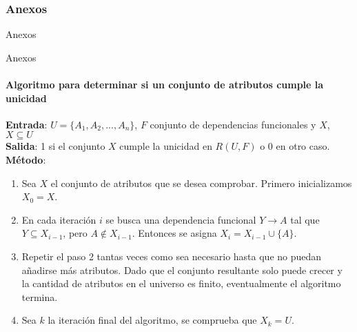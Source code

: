 \begin{frame}
    \frametitle{Anexos}

    \centering
    \Huge \textcolor{blue3}{Anexos}

\end{frame}

\begin{frame}{Anexos}
    \framesubtitle{Algoritmo para determinar si un conjunto de atributos cumple la unicidad}

    \textbf{Entrada}: $U = \{A_1,A_2,...,A_n\}$, $F$ conjunto de dependencias funcionales y $X$, $X \subseteq U$\\
    \textbf{Salida}: 1 si el conjunto $X$ cumple la unicidad en $R(U,F)$ o 0 en otro caso.\\
    \textbf{M\'etodo}:
    \begin{enumerate}
        \item Sea $X$ el conjunto de atributos que se desea comprobar. Primero inicializamos
        $X_0 = X$.
        \item En cada iteraci\'on $i$ se busca una dependencia funcional $Y \to A$ tal que
        $Y \subseteq X_{i-1}$, pero $A \notin X_{i-1}$. Entonces
        se asigna $X_i = X_{i-1} \cup \{A\}$.
        \item Repetir el paso 2 tantas veces como sea necesario hasta que no puedan a\~nadirse
        m\'as atributos. Dado que el conjunto resultante solo puede crecer y la cantidad de atributos
        en el universo es finito, eventualmente el algoritmo termina.
        \item Sea $k$ la iteraci\'on final del algoritmo, se comprueba que $X_k = U$.  
        
    \end{enumerate}
\end{frame}